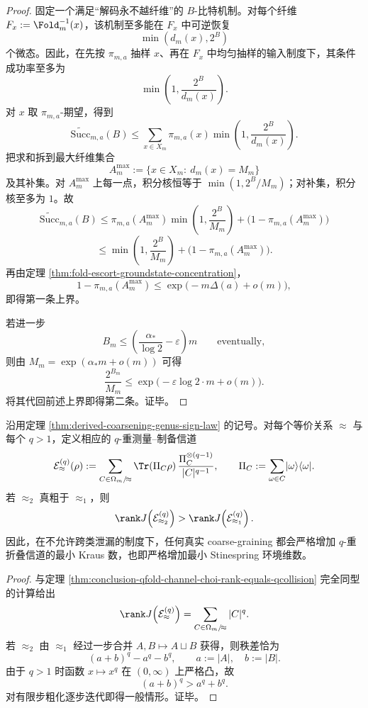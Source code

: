 \begin{proof}
固定一个满足“解码永不越纤维”的 \(B\)-比特机制。对每个纤维 \(F_x:=\Fold_m^{-1}(x)\)，该机制至多能在 \(F_x\) 中可逆恢复
\[
\min(d_m(x),2^B)
\]
个微态。因此，在先按 \(\pi_{m,a}\) 抽样 \(x\)、再在 \(F_x\) 中均匀抽样的输入制度下，其条件成功率至多为
\[
\min\!\left(1,\frac{2^B}{d_m(x)}\right).
\]
对 \(x\) 取 \(\pi_{m,a}\)-期望，得到
\[
\widetilde{\mathrm{Succ}}_{m,a}(B)
\le
\sum_{x\in X_m}\pi_{m,a}(x)\min\!\left(1,\frac{2^B}{d_m(x)}\right).
\]
把求和拆到最大纤维集合
\[
A_m^{\max}:=\{x\in X_m:\ d_m(x)=M_m\}
\]
及其补集。对 \(A_m^{\max}\) 上每一点，积分核恒等于 \(\min(1,2^B/M_m)\)；对补集，积分核至多为 \(1\)。故
\[
\widetilde{\mathrm{Succ}}_{m,a}(B)
\le
\pi_{m,a}(A_m^{\max})\min\!\left(1,\frac{2^B}{M_m}\right)
+\bigl(1-\pi_{m,a}(A_m^{\max})\bigr)
\]
\[
\le
\min\!\left(1,\frac{2^B}{M_m}\right)
+\bigl(1-\pi_{m,a}(A_m^{\max})\bigr).
\]
再由定理 \ref{thm:fold-escort-groundstate-concentration}，
\[
1-\pi_{m,a}(A_m^{\max})
\le
\exp\!\bigl(-m\Delta(a)+o(m)\bigr),
\]
即得第一条上界。

若进一步
\[
B_m\le \left(\frac{\alpha_\ast}{\log 2}-\varepsilon\right)m
\qquad\text{eventually},
\]
则由 \(M_m=\exp(\alpha_\ast m+o(m))\) 可得
\[
\frac{2^{B_m}}{M_m}
\le
\exp\!\bigl(-\varepsilon\log 2\cdot m+o(m)\bigr).
\]
将其代回前述上界即得第二条。证毕。
\end{proof}

\begin{corollary}\label{cor:derived-coarsening-strictly-increases-qfold-environment-rank}
沿用定理 \ref{thm:derived-coarsening-genus-sign-law} 的记号。对每个等价关系 \(\approx\) 与每个 \(q>1\)，定义相应的 \(q\)-重测量--制备信道
\[
\mathcal E_{\approx}^{(q)}(\rho)
:=
\sum_{C\in \Omega_m/\!\approx}
\Tr(\Pi_C\rho)\,
\frac{\Pi_C^{\otimes(q-1)}}{|C|^{q-1}},
\qquad
\Pi_C:=\sum_{\omega\in C}\ket{\omega}\bra{\omega}.
\]
若 \(\approx_2\) 真粗于 \(\approx_1\)，则
\[
\rank J\!\left(\mathcal E_{\approx_2}^{(q)}\right)
>
\rank J\!\left(\mathcal E_{\approx_1}^{(q)}\right).
\]
因此，在不允许跨类泄漏的制度下，任何真实 coarse-graining 都会严格增加 \(q\)-重折叠信道的最小 Kraus 数，也即严格增加最小 Stinespring 环境维数。
\end{corollary}

\begin{proof}
与定理 \ref{thm:conclusion-qfold-channel-choi-rank-equals-qcollision} 完全同型的计算给出
\[
\rank J\!\left(\mathcal E_{\approx}^{(q)}\right)=\sum_{C\in \Omega_m/\!\approx}|C|^q.
\]
若 \(\approx_2\) 由 \(\approx_1\) 经过一步合并 \(A,B\mapsto A\sqcup B\) 获得，则秩差恰为
\[
(a+b)^q-a^q-b^q,
\qquad
a:=|A|,
\quad
b:=|B|.
\]
由于 \(q>1\) 时函数 \(x\mapsto x^q\) 在 \((0,\infty)\) 上严格凸，故
\[
(a+b)^q>a^q+b^q.
\]
对有限步粗化逐步迭代即得一般情形。证毕。
\end{proof}

\endinput
